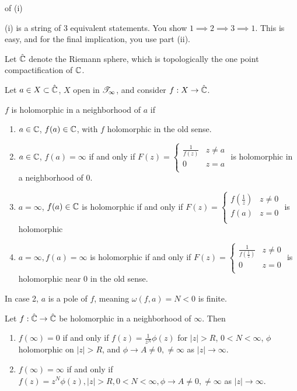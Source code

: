 \documentclass[x11names,reqno,14pt]{extarticle}
\newcommand{\oo}{{\infty}}
\begin{document}
\proof of (i)

(i) is a string of 3 equivalent statements. You show $1 \implies 2\implies 3 \implies 1$. This is easy, and for the final implication, you use part (ii). 

Let $\hat{\mathbb{C}}$ denote the Riemann sphere, which is topologically the one point compactification of $\mathbb{C}$. 


Let $a \in X \subset \hat{\mathbb{C}}$, $X$ open in $\ms{T}_{\oo}$, and consider $f:X\to\hat{\mathbb{C}}$. 

$f$ is holomorphic in a neighborhood of $a$ if
\begin{enumerate}
\item $a \in \mathbb{C}$, $f(a) \in \mathbb{C}$, with $f$ holomorphic in the old sense. 
\item $a \in \mathbb{C}$, $f(a) = \oo$ if and only if $F(z) = \begin{cases} \frac{1}{f(z)} & z\neq a\\ 0 & z = a \\ \end{cases}$ is holomorphic in a neighborhood of $0$. 
\item $a = \oo$, $f(a) \in \mathbb{C}$ is holomorphic if and only if $F(z) = \begin{cases} f(\frac{1}{z}) & z \neq0\\ f(a) & z = 0 \\ \end{cases}$ is holomorphic
\item $a = \oo, f(a) = \oo$ is holomorphic if and only if $F(z) = \begin{cases} \frac{1}{f(\frac{1}{z})} & z\neq0 \\ 0 & z = 0 \\ \end{cases}$ is holomorphic near 0 in the old sense. 
\end{enumerate}

In case 2, $a$ is a pole of $f$, meaning $\omega(f, a) = N < 0$ is finite. 

\thm

Let $f:\hat{\mathbb{C}}\to\hat{\mathbb{C}}$ be holomorphic in a neighborhood of $\oo$. Then 
\begin{enumerate}[label=(\roman*)]
\item $f(\oo) = 0$ if and only if $f(z) = \frac{1}{z^N}\phi(z)$ for $|z| > R$, $0<N < \oo$, $\phi$ holomorphic on $|z|>R$, and $\phi\to A\neq0, \neq\oo$ as $|z|\to\oo$. 
\item $f(\oo)=\oo$ if and only if $f(z) = z^N\phi(z), |z| > R, 0 < N < \oo, \phi\to A\neq0,\neq\oo$ as $|z|\to\oo$. 
\end{enumerate}
\end{document}
